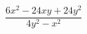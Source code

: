 \begin{ex}[type=expression]
	\begin{condition}
		\(\dfrac{6x^2-24xy+24y^2}{4y^2-x^2}\)
	\end{condition}
\end{ex}